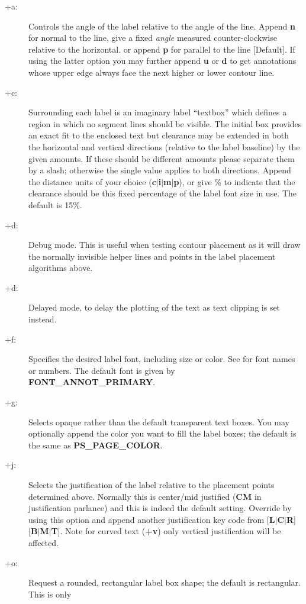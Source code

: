 \begin{description}
\item [+a:]  Controls the angle of the label relative to the angle of the line.  Append \textbf{n}
for normal to the line, give a fixed \emph{angle} measured counter-clockwise relative to the
horizontal. or append \textbf{p} for parallel to the line [Default].  If using 
the latter option you may further append \textbf{u} or \textbf{d} to get annotations whose upper edge
always face the next higher or lower contour line.
\item [+c:] Surrounding each label is an imaginary label ``textbox'' which defines a region in
which no segment lines should be visible.  The initial box provides an exact fit to the enclosed
text but clearance may be extended in both the horizontal and vertical directions (relative to the label
baseline) by the given amounts.  If these should be different amounts please separate them by
a slash; otherwise the single value applies to both directions.  Append the distance units of
your choice (\textbf{c$|$i$|$m$|$p}), or give \% to indicate that the clearance should be this
fixed percentage of the label font size in use.  The default is 15\%.
\item [+d:] Debug mode.  This is useful when testing contour placement as it will draw the normally
invisible helper lines and points in the label placement algorithms above.
\item [+d:] Delayed mode, to delay the plotting of the text as text clipping is set instead.
\item [+f:] Specifies the desired label font, including size or color.  See  for font names or numbers.  The
default font is given by \textbf{FONT\_ANNOT\_PRIMARY}.
\item [+g:] Selects opaque rather than the default transparent text boxes.  You may optionally append
the color you want to fill the label boxes; the default is the same as \textbf{PS\_PAGE\_COLOR}.
\item [+j:] Selects the justification of the label relative to the placement points determined
above.  Normally this is center/mid justified (\textbf{CM} in  justification parlance) and
this is indeed the default setting.  Override by using this option and append another justification
key code from [\textbf{L$|$C$|$R}][\textbf{B$|$M$|$T}].  Note for curved text (\textbf{+v}) only vertical
justification will be affected.
\item [+o:] Request a rounded, rectangular label box shape; the default is rectangular.  This is only

\end{description}
